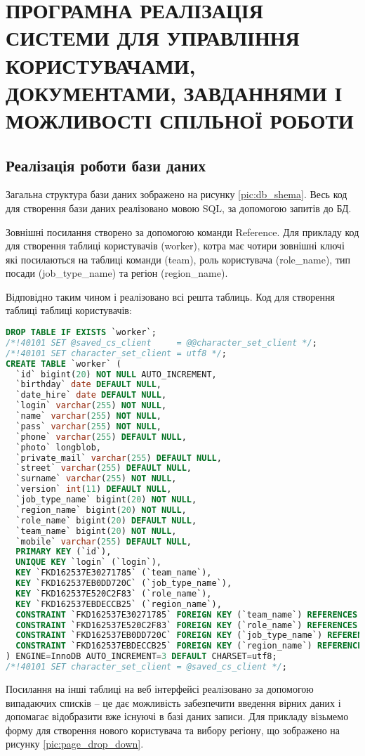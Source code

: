 \section{ПРОГРАМНА РЕАЛІЗАЦІЯ СИСТЕМИ ДЛЯ УПРАВЛІННЯ КОРИСТУВАЧАМИ, ДОКУМЕНТАМИ, ЗАВДАННЯМИ І МОЖЛИВОСТІ СПІЛЬНОЇ РОБОТИ}
\subsection{Реалізація роботи бази даних}
\par Загальна структура бази даних зображено на рисунку \ref{pic:db_shema}. Весь код для створення бази даних реалізовано мовою SQL, за допомогою запитів до БД.
\par Зовнішні посилання створено за допомогою команди Reference. Для прикладу код для створення таблиці користувачів (worker), котра має чотири зовнішні ключі які посилаються на таблиці команди (team), роль користувача (role\_name), тип посади (job\_type\_name) та регіон (region\_name).

\par Відповідно таким чином і реалізовано всі решта таблиць. Код для створення таблиці таблиці користувачів:
\begin{lstlisting}[language=SQL]
DROP TABLE IF EXISTS `worker`;
/*!40101 SET @saved_cs_client     = @@character_set_client */;
/*!40101 SET character_set_client = utf8 */;
CREATE TABLE `worker` (
  `id` bigint(20) NOT NULL AUTO_INCREMENT,
  `birthday` date DEFAULT NULL,
  `date_hire` date DEFAULT NULL,
  `login` varchar(255) NOT NULL,
  `name` varchar(255) NOT NULL,
  `pass` varchar(255) NOT NULL,
  `phone` varchar(255) DEFAULT NULL,
  `photo` longblob,
  `private_mail` varchar(255) DEFAULT NULL,
  `street` varchar(255) DEFAULT NULL,
  `surname` varchar(255) NOT NULL,
  `version` int(11) DEFAULT NULL,
  `job_type_name` bigint(20) NOT NULL,
  `region_name` bigint(20) NOT NULL,
  `role_name` bigint(20) DEFAULT NULL,
  `team_name` bigint(20) NOT NULL,
  `mobile` varchar(255) DEFAULT NULL,
  PRIMARY KEY (`id`),
  UNIQUE KEY `login` (`login`),
  KEY `FKD162537E30271785` (`team_name`),
  KEY `FKD162537EB0DD720C` (`job_type_name`),
  KEY `FKD162537E520C2F83` (`role_name`),
  KEY `FKD162537EBDECCB25` (`region_name`),
  CONSTRAINT `FKD162537E30271785` FOREIGN KEY (`team_name`) REFERENCES `team` (`id`),
  CONSTRAINT `FKD162537E520C2F83` FOREIGN KEY (`role_name`) REFERENCES `worker_role` (`id`),
  CONSTRAINT `FKD162537EB0DD720C` FOREIGN KEY (`job_type_name`) REFERENCES `worker_job_type` (`id`),
  CONSTRAINT `FKD162537EBDECCB25` FOREIGN KEY (`region_name`) REFERENCES `region` (`id`)
) ENGINE=InnoDB AUTO_INCREMENT=3 DEFAULT CHARSET=utf8;
/*!40101 SET character_set_client = @saved_cs_client */;	
\end{lstlisting}
\par Посилання на інші таблиці на веб інтерфейсі реалізовано за допомогою випадаючих списків -- це дає можливість забезпечити введення вірних даних і допомагає відобразити вже існуючі в базі даних записи.
Для прикладу візьмемо форму для створення нового користувача та вибору регіону, що зображено на рисунку \ref{pic:page_drop_down}.


